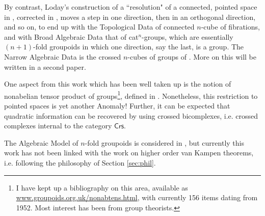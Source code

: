 \documentclass{elsarticle}
\def\Crs{\mathsf{Crs}}
\def\Crs{\mathsf{Crs}}
\def\Crs{\mathsf{Crs}}
\begin{document}
By contrast, Loday's construction of a ``resolution" of a connected, pointed space in \cite{Lod82},
corrected in \cite{St}, moves a step in one direction, then in an orthogonal direction, and so on, to
end up with the Topological Data of connected $n$-cube of fibrations, and with Broad Algebraic
Data that of cat$^n$-groups, which are essentially $(n + 1)$-fold groupoids in which one direction,
say the last, is a group. The Narrow Algebraic Data is the crossed $n$-cubes of groups of \cite{ESt}. More on this will be written in a second paper.

One aspect from this work which has been well taken up is the notion of nonabelian tensor
product of groups\footnote{I have kept up a bibliography on this area, available as \url{www.groupoids.org.uk/nonabtens.html},
with currently 156 items dating from 1952. Most interest has been from group theorists. }, defined in \cite{BL87}.  Nonetheless, this restriction to pointed spaces is
yet another Anomaly!  Further, it can be expected that quadratic information can be recovered by using crossed bicomplexes, i.e. crossed complexes internal to the category $\Crs$.



The Algebraic Model of $n$-fold groupoids is considered in \cite{BB12}, but currently this work has not   been linked with the work on higher order van Kampen theorems, i.e.  following the philosophy of Section \ref{sec:phil}.
\end{document}
